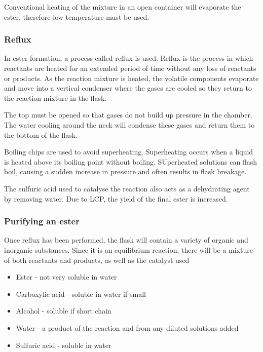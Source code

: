 			Conventional heating of the mixture in an open container will evaporate the ester, therefore low temperature must be used.

		\subsubsection{Reflux}
		
			In ester formation, a process called reflux is used. Reflux is the process in which reactants are heated for an extended period of time without any loss of reactants or products. As the reaction mixture is heated, the volatile components evaporate and move into a vertical condenser where the gases are cooled so they return to the reaction mixture in the flask.

			The top must be opened so that gases do not build up pressure in the chamber. The water cooling around the neck will condense these gases and return them to the bottom of the flask.

			Boiling chips are used to avoid superheating. Superheating occurs when a liquid is heated above its boiling point without boiling. SUperheated solutions can flash boil, causing a sudden increase in pressure and often results in flask breakage.

			The sulfuric acid used to catalyse the reaction also acts as a dehydrating agent by removing water. Due to LCP, the yield of the final ester is increased.

		\subsubsection{Purifying an ester}
		
			Once reflux has been performed, the flask will contain a variety of organic and inorganic substances. Since it is an equilibrium reaction, there will be a mixture of both reactants and products, as well as the catalyst used

				\begin{itemize}
					\item Ester - not very soluble in water
					\item Carboxylic acid - soluble in water if small
					\item Alcohol - soluble if short chain
					\item Water - a product of the reaction and from any diluted solutions added
					\item Sulfuric acid - soluble in water
				\end{itemize}


